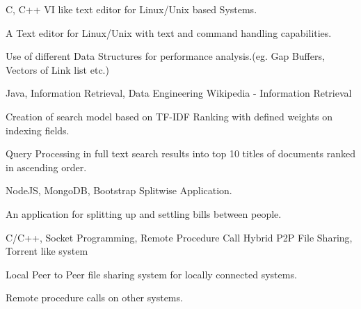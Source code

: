 
\begin{cventries}

     \cventry
    {C, C++} %
    {VI like text editor for Linux/Unix based Systems.} %
    {} %
    {} %
    {
      \begin{cvitems} %
        \item {A Text editor for Linux/Unix with text and command handling capabilities.}
        \item {Use of different Data Structures for performance analysis.(eg. Gap Buffers, Vectors of Link list etc.)}
      \end{cvitems}
    }
    
    \cventry
    {Java, Information Retrieval, Data Engineering} %
    {Wikipedia - Information Retrieval} %
    {} %
    {} %
    {
      \begin{cvitems} %
        \item {Creation of search model based on TF-IDF Ranking with defined weights on indexing fields.}
        \item {Query Processing in full text search results into top 10 titles of documents ranked in ascending order.}
      \end{cvitems}
    }
    
    \cventry
    {NodeJS, MongoDB, Bootstrap} %
    {Splitwise Application.} %
    {} %
    {} %
    {
      \begin{cvitems} %
        \item {An application for splitting up and settling bills between people.}
      \end{cvitems}
    }
    
     \cventry
    {C/C++, Socket Programming, Remote Procedure Call} %
    {Hybrid P2P File Sharing, Torrent like system} %
    {} %
    {} %
    {
      \begin{cvitems} %
        \item {Local Peer to Peer file sharing system for locally connected systems.}
        \item {Remote procedure calls on other systems.}
      \end{cvitems}
    }
    


\end{cventries}
